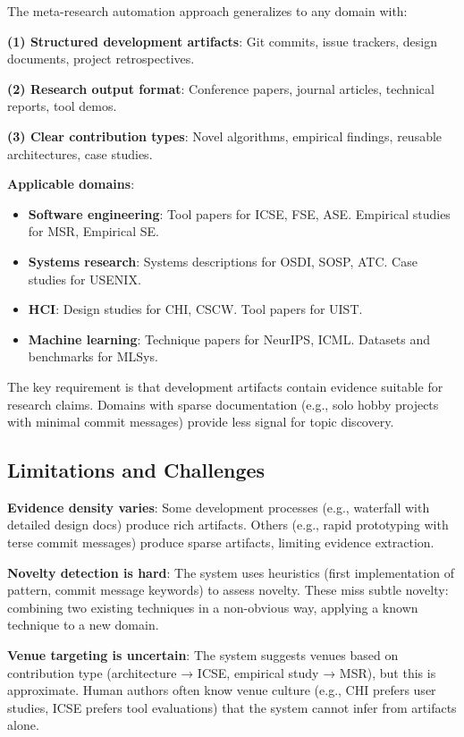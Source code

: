 The meta-research automation approach generalizes to any domain with:

\textbf{(1) Structured development artifacts}: Git commits, issue trackers, design documents, project retrospectives.

\textbf{(2) Research output format}: Conference papers, journal articles, technical reports, tool demos.

\textbf{(3) Clear contribution types}: Novel algorithms, empirical findings, reusable architectures, case studies.

\textbf{Applicable domains}:
\begin{itemize}
\item \textbf{Software engineering}: Tool papers for ICSE, FSE, ASE. Empirical studies for MSR, Empirical SE.
\item \textbf{Systems research}: Systems descriptions for OSDI, SOSP, ATC. Case studies for USENIX.
\item \textbf{HCI}: Design studies for CHI, CSCW. Tool papers for UIST.
\item \textbf{Machine learning}: Technique papers for NeurIPS, ICML. Datasets and benchmarks for MLSys.
\end{itemize}

The key requirement is that development artifacts contain evidence suitable for research claims. Domains with sparse documentation (e.g., solo hobby projects with minimal commit messages) provide less signal for topic discovery.

\subsection{Limitations and Challenges}

\textbf{Evidence density varies}: Some development processes (e.g., waterfall with detailed design docs) produce rich artifacts. Others (e.g., rapid prototyping with terse commit messages) produce sparse artifacts, limiting evidence extraction.

\textbf{Novelty detection is hard}: The system uses heuristics (first implementation of pattern, commit message keywords) to assess novelty. These miss subtle novelty: combining two existing techniques in a non-obvious way, applying a known technique to a new domain.

\textbf{Venue targeting is uncertain}: The system suggests venues based on contribution type (architecture → ICSE, empirical study → MSR), but this is approximate. Human authors often know venue culture (e.g., CHI prefers user studies, ICSE prefers tool evaluations) that the system cannot infer from artifacts alone.

